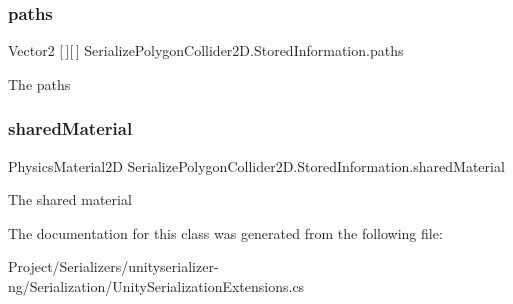 \subsubsection{\texorpdfstring{paths}{paths}}
{\footnotesize\ttfamily Vector2 \mbox{[}$\,$\mbox{]}\mbox{[}$\,$\mbox{]} Serialize\+Polygon\+Collider2\+D.\+Stored\+Information.\+paths}



The paths 

\mbox{\label{class_serialize_polygon_collider2_d_1_1_stored_information_a3bde1275cddf18a2b9d7a53a2d9d9ace}} 
\subsubsection{\texorpdfstring{shared\+Material}{sharedMaterial}}
{\footnotesize\ttfamily Physics\+Material2D Serialize\+Polygon\+Collider2\+D.\+Stored\+Information.\+shared\+Material}



The shared material 



The documentation for this class was generated from the following file\+:\begin{DoxyCompactItemize}
\item 
Project/\+Serializers/unityserializer-\/ng/\+Serialization/Unity\+Serialization\+Extensions.\+cs\end{DoxyCompactItemize}
